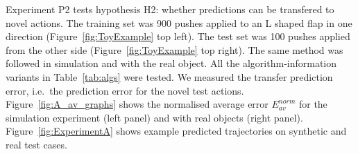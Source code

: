 Experiment P2 tests hypothesis H2: whether predictions can be
transfered to novel actions.  The training set was 900 pushes applied to an L shaped flap in one direction (Figure~\ref{fig:ToyExample} top
left).  The test set was 100 pushes applied from the other side (Figure~\ref{fig:ToyExample} top right). The same method was followed in simulation and with the real object. All the algorithm-information variants in Table~\ref{tab:algs} were tested. We measured the transfer prediction error, i.e.\ the prediction error for the novel test actions. Figure~\ref{fig:A_av_graphs} %
shows the normalised average error $E_{av}^{norm}$ for the simulation experiment (left panel) and with real objects (right panel).
Figure~\ref{fig:ExperimentA} shows example predicted trajectories on
synthetic and real test cases.



